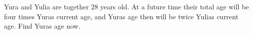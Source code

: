 Yura and Yulia are together $28$ years old. At a future time their total age will be four times Yura\textquotesingle s current age, and Yura\textquotesingle s age then will be twice Yulia\textquotesingle s current age. Find Yura\textquotesingle s age now.
